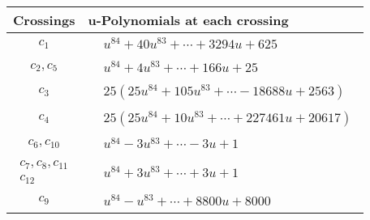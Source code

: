 \documentclass[1p]{elsarticle_modified}
\theoremstyle{definition}
\begin{document}
\begin{tabular}{m{50pt}|m{274pt}}
Crossings & \hspace{64pt}u-Polynomials at each crossing \\
\hline $$\begin{aligned}c_{1}\end{aligned}$$&$\begin{aligned}
&u^{84}+40 u^{83}+\cdots+3294 u+625
\end{aligned}$\\
\hline $$\begin{aligned}c_{2},c_{5}\end{aligned}$$&$\begin{aligned}
&u^{84}+4 u^{83}+\cdots+166 u+25
\end{aligned}$\\
\hline $$\begin{aligned}c_{3}\end{aligned}$$&$\begin{aligned}
&25(25 u^{84}+105 u^{83}+\cdots-18688 u+2563)
\end{aligned}$\\
\hline $$\begin{aligned}c_{4}\end{aligned}$$&$\begin{aligned}
&25(25 u^{84}+10 u^{83}+\cdots+227461 u+20617)
\end{aligned}$\\
\hline $$\begin{aligned}c_{6},c_{10}\end{aligned}$$&$\begin{aligned}
&u^{84}-3 u^{83}+\cdots-3 u+1
\end{aligned}$\\
\hline $$\begin{aligned}c_{7},c_{8},c_{11}\\c_{12}\end{aligned}$$&$\begin{aligned}
&u^{84}+3 u^{83}+\cdots+3 u+1
\end{aligned}$\\
\hline $$\begin{aligned}c_{9}\end{aligned}$$&$\begin{aligned}
&u^{84}- u^{83}+\cdots+8800 u+8000
\end{aligned}$\\
\hline
\end{tabular}\\~\\
\end{document}
